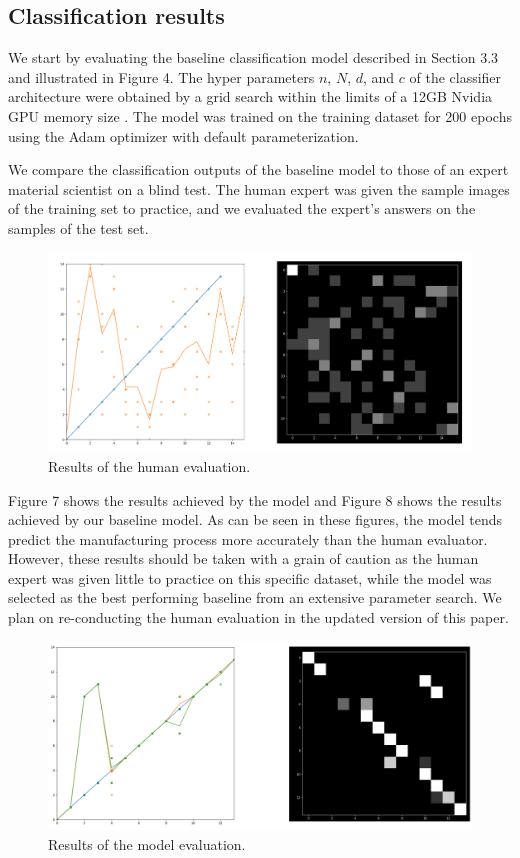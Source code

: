 \documentclass[10pt,twocolumn,letterpaper]{article}
\begin{document}
\subsection{Classification results}
% 
We start by evaluating the baseline classification model described in Section 3.3 and illustrated in Figure 4.
The hyper parameters $n$, $N$, $d$, and $c$ of the classifier architecture 
were obtained by a grid search within the limits of a 12GB Nvidia GPU memory size .
The model was trained on the training dataset for 200 epochs using the Adam optimizer with default parameterization.

We compare the classification outputs of the baseline model to those 
of an expert material scientist on a blind test.
The human expert was given the sample images of the training set to practice,
and we evaluated the expert's answers on the samples of the test set.

\begin{figure}[h]
	\centering
	\includegraphics[width=0.9\linewidth]{"./figures/Figure7"}
	\caption{
		Results of the human evaluation.
	}
\end{figure}

Figure 7 shows the results achieved by the model and Figure 8 shows the results achieved by our baseline model.
As can be seen in these figures, the model tends predict the manufacturing 
process more accurately than the human evaluator.
However, these results should be taken with a grain of caution 
as the human expert was given little to practice on this specific dataset,
while the model was selected as the best performing baseline from an extensive parameter search.
We plan on re-conducting the human evaluation in the updated version of this paper.

\begin{figure}[h]
	\centering
	\includegraphics[width=0.9\linewidth]{"./figures/Figure8"}
	\caption{
		Results of the model evaluation.
	}
\end{figure}
\end{document}
